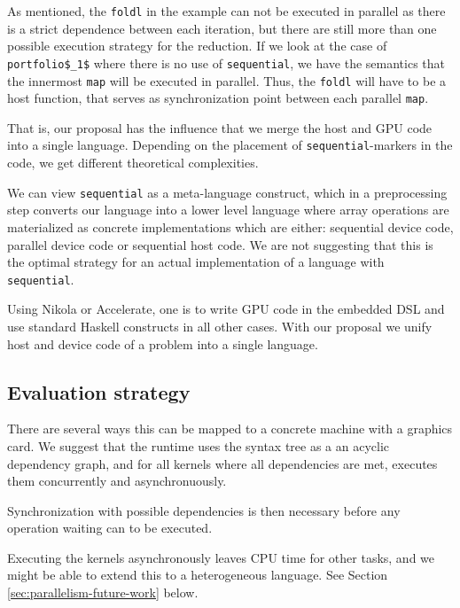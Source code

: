 As mentioned, the \lstinline{foldl} in the example can not be executed
in parallel as there is a strict dependence between each iteration,
but there are still more than one possible execution strategy for the
reduction. If we look at the case of
\lstinline[mathescape]{portfolio$_1$} where there is no use of
\lstinline{sequential}, we have the semantics that the innermost
\lstinline{map} will be executed in parallel. Thus, the
\lstinline{foldl} will have to be a host function, that serves as
synchronization point between each parallel \lstinline{map}.

That is, our proposal has the influence that we merge the host and GPU code
into a single language. Depending on the placement of
\lstinline{sequential}-markers in the code, we get different theoretical
complexities.

We can view \lstinline{sequential} as a meta-language construct, which
in a preprocessing step converts our language into a lower level
language where array operations are materialized as concrete
implementations which are either: sequential device code, parallel
device code or sequential host code. We are not suggesting that this
is the optimal strategy for an actual implementation of a language
with \lstinline{sequential}.

Using Nikola or Accelerate, one is to write GPU code in the embedded
DSL and use standard Haskell constructs in all other cases. With our
proposal we unify host and device code of a problem into a single
language.

\subsection{Evaluation strategy}
There are several ways this can be mapped to a concrete machine with a
graphics card. We suggest that the runtime uses the syntax tree as a
an acyclic dependency graph, and for all kernels where all
dependencies are met, executes them concurrently and asynchronuously.

Synchronization with possible dependencies is then necessary before
any operation waiting can to be executed.

Executing the kernels asynchronously leaves CPU time for other tasks,
and we might be able to extend this to a heterogeneous language. See
Section \ref{sec:parallelism-future-work} below.

